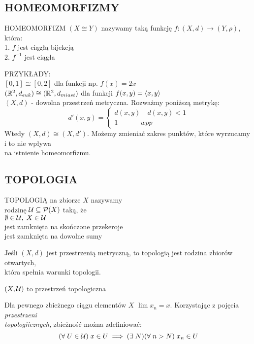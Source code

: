 \documentclass{article}
\begin{document}
\subsection{HOMEOMORFIZMY}
\begin{center}\large
    {\color{def}HOMEOMORFIZM} $(X\cong Y)$ nazywamy taką funkcję $f:(X, d)\to (Y, \rho)$, która:\smallskip\\
    1. $f$ jest ciągłą bijekcją\smallskip\\
    2. $f^{-1}$ jest ciągła
\end{center}\bigskip
{\large\color{emp}PRZYKŁADY:}\medskip\\
$[0, 1]\cong[0,2]$ dla funkcji np. $f(x)=2x$\smallskip\\
$(\mathbb{R}^2, d_{euk})\cong(\mathbb{R}^2, d_{miast})$ dla funkcji $f(x, y)=\langle x,y\rangle$\medskip\\
$(X,d)$ - dowolna przestrzeń metryczna. Rozważmy poniższą metrykę:
$$d'(x, y)=\begin{cases}d(x, y)\quad d(x, y) < 1\\1\quad \quad \quad \;wpp\end{cases}$$
Wtedy $(X, d)\cong (X, d')$. Możemy zmieniać zakres punktów, które wyrzucamy i to nie wpływa \\na istnienie homeomorfizmu.
\subsection{TOPOLOGIA}
\begin{center}\large
    {\color{def}TOPOLOGIĄ} na zbiorze $X$ nazywamy \\rodzinę $\mathcal{U}\subseteq \mathcal{P}(X)$ taką, że\smallskip\\
    $\emptyset\in \mathcal{U},\; X\in\mathcal{U}$\smallskip\\
    {\normalsize jest zamknięta na skończone przekeroje\\jest zamknięta na dowolne sumy}
\end{center}\bigskip
Jeśli $(X, d)$ jest przestrzenią metryczną, to {\color{emp}topologią jest rodzina zbiorów otwartych}, \\która spełnia warunki topologii.

\begin{center}\large
    $(X, \mathcal{U})$ to przestrzeń topologiczna
\end{center}\bigskip
Dla pewnego zbieżnego ciągu elementów $X$ $\lim x_n=x$. Korzystając z pojęcia \emph{przestrzeni \\topologiicznych,} zbieżność można zdefiniować:
$$(\forall\;U\in\mathcal{U})\;x\in U\implies(\exists\;N)(\forall\;n>N)\;x_n\in U$$
\end{document}
